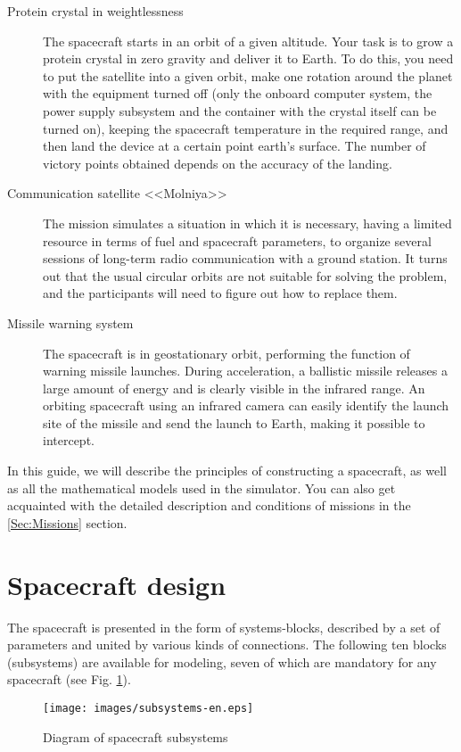 \documentclass[12pt,a4paper]{article}
\begin{document}
\begin{description}
   \item[Protein crystal in weightlessness] The spacecraft starts in an orbit of a given altitude. Your task is to grow a protein crystal in zero gravity and deliver it to Earth. To do this, you need to put the satellite into a given orbit, make one rotation around the planet with the equipment turned off (only the onboard computer system, the power supply subsystem and the container with the crystal itself can be turned on), keeping the spacecraft temperature in the required range, and then land the device at a certain point earth's surface. The number of victory points obtained depends on the accuracy of the landing.
   \item[Communication satellite <<Molniya>>] The mission simulates a situation in which it is necessary, having a limited resource in terms of fuel and spacecraft parameters, to organize several sessions of long-term radio communication with a ground station. It turns out that the usual circular orbits are not suitable for solving the problem, and the participants will need to figure out how to replace them.
   \item[Missile warning system] The spacecraft is in geostationary orbit, performing the function of warning missile launches. During acceleration, a ballistic missile releases a large amount of energy and is clearly visible in the infrared range. An orbiting spacecraft using an infrared camera can easily identify the launch site of the missile and send the launch to Earth, making it possible to intercept.
\end{description}

In this guide, we will describe the principles of constructing a spacecraft, as well as all the mathematical models used in the simulator. You can also get acquainted with the detailed description and conditions of missions in the \ref{Sec:Missions} section.

\section{Spacecraft design}

The spacecraft is presented in the form of systems-blocks, described by a set of parameters and united by various kinds of connections. The following ten blocks (subsystems) are available for modeling, seven of which are mandatory for any spacecraft (see Fig. \ref{Pic:subsystems}).

\begin{figure}[tbh]
  \begin{center}
    \texttt{[image: images/subsystems-en.eps]}
    \caption{Diagram of spacecraft subsystems}
    \label{Pic:subsystems}
  \end{center}
\end{figure}
\end{document}
